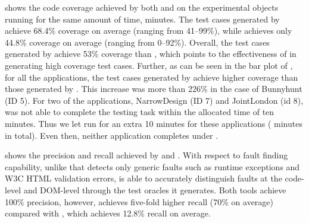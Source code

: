  shows the code coverage achieved by  both \tool and \artemis on the experimental objects running for the same amount of time,  minutes.
The test cases generated by \tool achieve 68.4\% coverage on average (ranging from 41--99\%), while \artemis achieves only 44.8\% coverage on average (ranging from 0--92\%).
Overall, the test cases generated by \tool achieve 53\% coverage than \artemis, which points to the effectiveness of \tool in generating high coverage test cases. 
Further, as can be seen in the bar plot of , for all the applications, the test cases generated by \tool achieve higher coverage than those generated by \artemis. 
This increase was more than 226\% in the case of Bunnyhunt (ID 5). %
For two of the applications, NarrowDesign (ID 7) and JointLondon (id 8), \artemis was not able to complete the testing task within the allocated time of ten minutes.
Thus we let \artemis run for an extra 10 minutes for these applications ( minutes in total). Even then, neither application completes under \artemis. 

 shows the precision and recall achieved by \tool and \artemis.
With respect to fault finding capability, unlike \artemis that detects only generic faults such as runtime exceptions and W3C HTML validation errors, \tool is able to accurately distinguish faults at the code-level and DOM-level through the test oracles it generates. Both tools achieve 100\% precision, however, \tool achieves five-fold higher recall (70\% on average) compared with \artemis, which achieves 12.8\% recall on average. %
